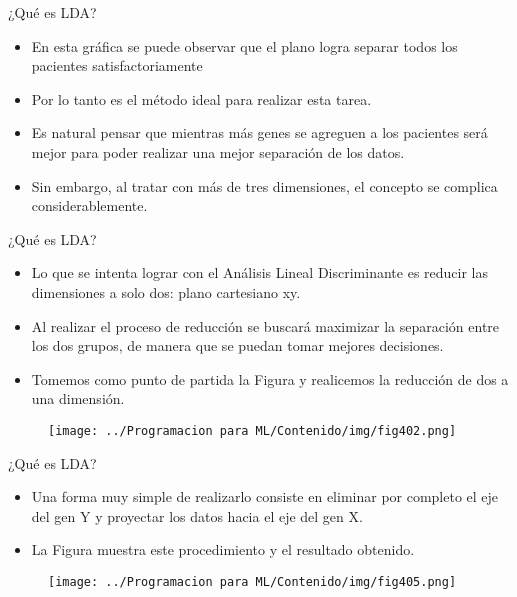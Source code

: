 \documentclass[11pt,aspectratio=169]{beamer}
\begin{document}
\begin{frame}{¿Qué es LDA?}
\begin{itemize}
	\item En esta gráfica se puede observar que el plano logra separar todos los pacientes satisfactoriamente\pause
	\item Por lo tanto es el método ideal para realizar esta tarea.\pause
	\item Es natural pensar que mientras más genes se agreguen a los pacientes será mejor para poder realizar una mejor separación de los datos.\pause
	\item Sin embargo, al tratar con más de tres dimensiones, el concepto se complica considerablemente\footnotemark[2]. 
\end{itemize}
\end{frame}

\begin{frame}{¿Qué es LDA?}
\begin{itemize}
	\item Lo que se intenta lograr con el Análisis Lineal Discriminante es reducir las dimensiones a solo dos: plano cartesiano xy. \pause
	\item Al realizar el proceso de reducción se buscará maximizar la separación entre los dos grupos, de manera que se puedan tomar 
		mejores decisiones. \pause
	\item Tomemos como punto de partida la Figura y realicemos la reducción de dos a una dimensión. 
\end{itemize}
\begin{figure}[H]
	\centering
	\texttt{[image: ../Programacion para ML/Contenido/img/fig402.png]}
\end{figure}
\end{frame}

\begin{frame}{¿Qué es LDA?}
\begin{itemize}
	\item Una forma muy simple de realizarlo consiste en eliminar por completo el eje del gen Y y proyectar los datos hacia el eje del gen X. \pause
	\item La Figura muestra este procedimiento y el resultado obtenido.\pause
\end{itemize}
\begin{figure}[H]
	\centering
	\texttt{[image: ../Programacion para ML/Contenido/img/fig405.png]}
\end{figure}
\end{frame}
\end{document}
